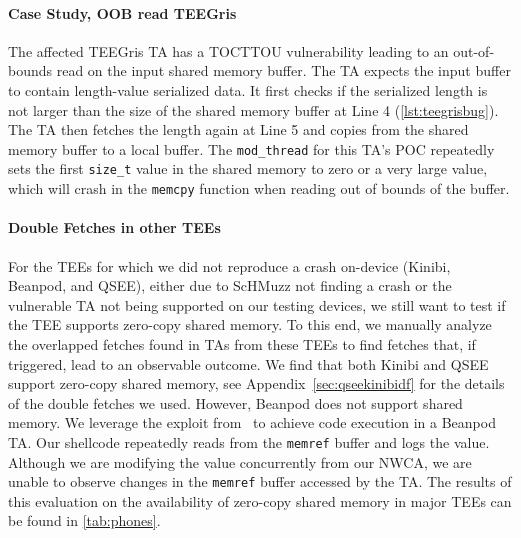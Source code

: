 \documentclass[conference]{IEEEtran}
\newcommand{\sysname}{ScHMuzz\xspace}
\newcommand{\teegris}{TEEGris\xspace}
\newcommand{\beanpod}{Beanpod\xspace}
\newcommand{\kinibi}{Kinibi\xspace}
\newcommand{\qsee}{QSEE\xspace}
\begin{document}
\paragraph{Case Study, OOB read \teegris}

\begin{listing}[h]
    
    \label{lst:teegrisbug}
\end{listing}

The affected \teegris TA has a TOCTTOU vulnerability leading to an out-of-bounds read on the 
input shared memory buffer. The TA expects the input buffer to contain length-value 
serialized data. It first checks if the 
serialized length is not larger than the size of the shared memory buffer at Line 4 (\autoref{lst:teegrisbug}).
The TA then fetches the length again at Line 5 and copies from the shared memory buffer to 
a local buffer. The \texttt{mod\_thread} for this TA's POC repeatedly sets the 
first \texttt{size\_t} value in the shared memory to zero or a very large value, 
which will crash in the \texttt{memcpy} function when reading out of bounds of the buffer.

\paragraph{Double Fetches in other TEEs}

For the TEEs for which we did not reproduce a crash on-device (\kinibi, \beanpod, and 
\qsee), either due to \sysname not finding a crash or the vulnerable TA not 
being supported on our testing devices, we still want to test if the TEE supports 
zero-copy shared memory. To this end, we manually analyze the overlapped fetches found 
in TAs from these TEEs to find fetches that, if triggered, lead to an observable 
outcome. We find that both \kinibi and \qsee support zero-copy shared memory, see Appendix~\ref{sec:qseekinibidf} 
for the details of the double fetches we used. However, \beanpod does not support 
shared memory. We leverage the exploit from~\cite{globalconfusion} to 
achieve code execution in a \beanpod TA. Our shellcode repeatedly reads from the 
\texttt{memref} buffer and logs the value. Although we are modifying the value concurrently
from our NWCA, we are unable to observe changes in the \texttt{memref} buffer accessed by the TA.
The results of this evaluation on the availability of zero-copy shared memory in major TEEs 
can be found in \autoref{tab:phones}.
\end{document}
